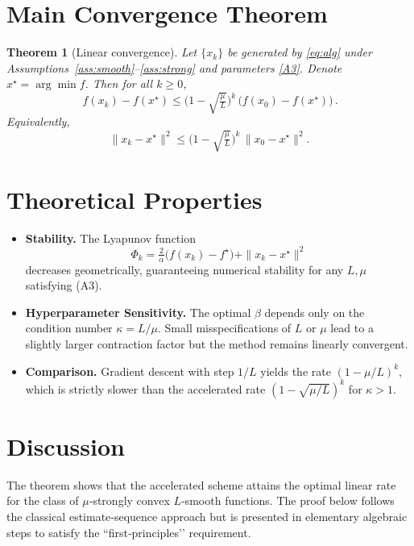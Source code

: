 \documentclass{article}
\newtheorem{theorem}{Theorem}
\begin{document}
\section*{Main Convergence Theorem}
\begin{theorem}[Linear convergence]\label{thm:linear}
Let $\{x_{k}\}$ be generated by \eqref{eq:alg} under Assumptions~\ref{ass:smooth}–\ref{ass:strong} and parameters \eqref{A3}.  
Denote $x^{\star}=\arg\min f$. Then for all $k\ge 0$,
\[
\boxed{\,f(x_{k})-f(x^{\star})\le
\bigl(1-\sqrt{\tfrac{\mu}{L}}\bigr)^{k}\,
\bigl(f(x_{0})-f(x^{\star})\bigr)\, } .
\tag{3}
\]
Equivalently,
\[
\|x_{k}-x^{\star}\|^{2}\le
\bigl(1-\sqrt{\tfrac{\mu}{L}}\bigr)^{k}\,
\|x_{0}-x^{\star}\|^{2}.
\tag{4}
\]
\end{theorem}
\section*{Theoretical Properties}
\begin{itemize}
\item \textbf{Stability.} The Lyapunov function 
\[
\Phi_{k}= \tfrac{2}{\alpha}\bigl(f(x_{k})-f^{\star}\bigr)+\|x_{k}-x^{\star}\|^{2}
\]
decreases geometrically, guaranteeing numerical stability for any $L,\mu$ satisfying (A3). 
\item \textbf{Hyperparameter Sensitivity.} The optimal $\beta$ depends only on the condition number $\kappa=L/\mu$. Small misspecifications of $L$ or $\mu$ lead to a slightly larger contraction factor but the method remains linearly convergent. 
\item \textbf{Comparison.} Gradient descent with step $1/L$ yields the rate $(1-\mu/L)^{k}$, which is strictly slower than the accelerated rate $(1-\sqrt{\mu/L})^{k}$ for $\kappa>1$.
\end{itemize}
\section*{Discussion}
The theorem shows that the accelerated scheme attains the optimal linear rate for the class of $\mu$‑strongly convex $L$‑smooth functions. The proof below follows the classical estimate‑sequence approach but is presented in elementary algebraic steps to satisfy the “first‑principles’’ requirement.

\end{document}
